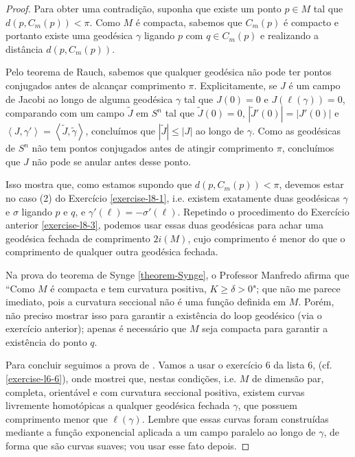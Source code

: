 \begin{proof}
Para obter uma contradição, suponha que existe um ponto $p \in M$ tal que
 $d(p, C_m(p))<\pi$. Como $M$ é compacta, sabemos que $C_m(p)$ é compacto e
portanto existe uma geodésica $\gamma$ ligando $p$ com $q \in C_m(p)$ e
realizando a distância $d(p,C_m(p))$.

Pelo teorema de Rauch, sabemos que qualquer geodésica não pode ter pontos
conjugados antes de alcançar comprimento $\pi$. Explicitamente, se $J$ é um
campo de Jacobi ao longo de alguma geodésica $\gamma$ tal que $J(0)=0$ e 
$J(\ell(\gamma))=0$, comparando com um campo $\tilde{J}$ em $S^n$ tal que
 $\tilde{J}(0)=0$, $|\tilde{J}'(0)|=|J'(0)|$ e 
$\left<J,\gamma'\right>=\left<\tilde{J},\tilde{\gamma}\right>$, concluímos que
 $|\tilde{J}|\leq |J|$ ao longo de $\gamma$. Como as geodésicas de $S^n$ não
 tem pontos conjugados antes de atingir comprimento $\pi$, concluímos que 
$J$ não pode se anular antes desse ponto.

Isso mostra que, como estamos supondo que $d(p,C_m(p))<\pi$, devemos estar no
caso (2) do Exercício \ref{exercise-l8-1}, i.e. existem exatamente duas
geodésicas $\gamma$ e $\sigma$ ligando $p$ e $q$, e
$\gamma'(\ell)=-\sigma'(\ell)$. Repetindo o procedimento do Exercício anterior
 \ref{exercise-l8-3}, podemos usar essas duas geodésicas para achar uma 
geodésica fechada de comprimento $2i(M)$, cujo comprimento é menor do que o
comprimento de qualquer outra geodésica fechada.

\begin{remark}
\label{remark-curvatura-positiva-implica-maior-que-constante-positiva}
Na prova do teorema de Synge \ref{theorem-Synge}, o Professor
Manfredo afirma que ``Como $M$ é compacta e tem curvatura positiva, $K\geq
\delta>0$"; que não me parece imediato, pois a curvatura seccional não é uma
função definida em $M$. Porém, não preciso mostrar isso para garantir a
existência do loop geodésico (via o exercício anterior); apenas é necessário 
que $M$ seja compacta para garantir a existência do ponto $q$.
\end{remark}

\medskip

Para concluir seguimos a prova de \cite{doc}. Vamos a usar o exercício 6 da
lista 6, (cf. \ref{exercise-l6-6}), onde mostrei que, nestas condições, i.e.
$M$ de dimensão par, completa, orientável e com curvatura seccional positiva,
existem curvas livremente homotópicas a qualquer geodésica fechada $\gamma$, que
possuem comprimento menor que $\ell(\gamma)$. Lembre que essas curvas foram
construídas mediante a função exponencial aplicada a um campo paralelo ao longo
de $\gamma$, de forma que são curvas suaves; vou usar esse fato depois.


\end{proof}
